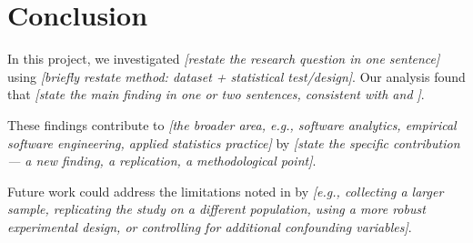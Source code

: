 
\section{Conclusion}
\label{S:conclusion}
 
 
In this project, we investigated \textit{[restate the research question in one sentence]} using \textit{[briefly restate method: dataset + statistical test/design]}. Our analysis found that \textit{[state the main finding in one or two sentences, consistent with  and ]}.
 
These findings contribute to \textit{[the broader area, e.g., software analytics, empirical software engineering, applied statistics practice]} by \textit{[state the specific contribution — a new finding, a replication, a methodological point]}.
 
Future work could address the limitations noted in  by \textit{[e.g., collecting a larger sample, replicating the study on a different population, using a more robust experimental design, or controlling for additional confounding variables]}.
 